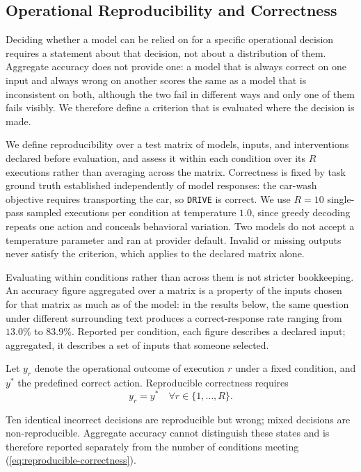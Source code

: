 \subsection{Operational Reproducibility and Correctness}
\label{sec:operational-reproducibility}

Deciding whether a model can be relied on for a specific operational decision requires
a statement about that decision, not about a distribution of them. Aggregate accuracy
does not provide one: a model that is always correct on one input and always wrong on
another scores the same as a model that is inconsistent on both, although the two fail
in different ways and only one of them fails visibly. We therefore define a criterion
that is evaluated where the decision is made.

We define reproducibility over a test matrix of models, inputs, and
interventions declared before evaluation, and assess it within each condition
over its $R$ executions rather than averaging across the matrix. Correctness is
fixed by task ground truth established independently of model responses: the
car-wash objective requires transporting the car, so \texttt{DRIVE} is correct.
We use $R=10$ single-pass sampled executions per condition at temperature $1.0$,
since greedy decoding repeats one action and conceals behavioral variation. Two
models do not accept a temperature parameter and ran at provider default. Invalid
or missing outputs never satisfy the criterion, which applies to the declared
matrix alone.

Evaluating within conditions rather than across them is not stricter bookkeeping.
An accuracy figure aggregated over a matrix is a property of the inputs chosen for
that matrix as much as of the model: in the results below, the same question under
different surrounding text produces a correct-response rate ranging from $13.0\%$ to
$83.9\%$. Reported per condition, each figure describes a declared input;
aggregated, it describes a set of inputs that someone selected.

Let $y_r$ denote the operational outcome of execution $r$ under
a fixed condition, and $y^*$ the predefined correct action.
Reproducible correctness requires
\begin{equation}
    y_r = y^* \quad \forall r \in \{1,\ldots,R\}.
    \label{eq:reproducible-correctness}
\end{equation}

Ten identical incorrect decisions are reproducible but wrong;
mixed decisions are non-reproducible. Aggregate accuracy cannot
distinguish these states and is therefore reported separately
from the number of conditions meeting (\ref{eq:reproducible-correctness}).

